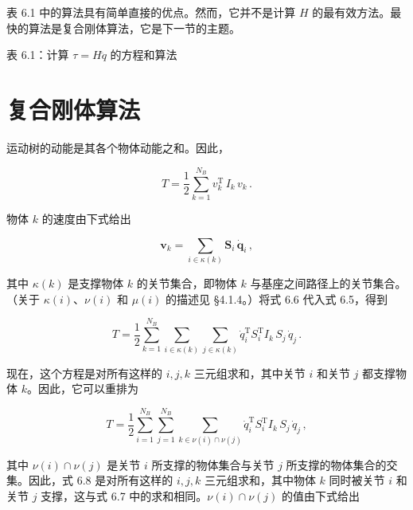 \documentclass[10pt,a4paper]{book}
\theoremstyle{thmstyle} %
\theoremstyle{defstyle} %
\theoremstyle{prostyle} %
\begin{document}
表 6.1 中的算法具有简单直接的优点。然而，它并不是计算 $H$ 的最有效方法。最快的算法是复合刚体算法，它是下一节的主题。



表 6.1：计算 $\tau = H\ddot{q}$ 的方程和算法





\section{复合刚体算法}





运动树的动能是其各个物体动能之和。因此，



$$
T = \frac { 1 } { 2 } \sum _ { k = 1 } ^{N _ { B} } v _ { k } ^{\mathrm { T} } \, I _ { k } \, v _ { k } \, .
$$



物体 $k$ 的速度由下式给出



$$
{ \boldsymbol { v } } _ { k } = \sum _ { i \in \kappa ( k ) } { \boldsymbol { S } } _ { i } \, { \dot { \boldsymbol { q } } } _ { i } \, ,
$$



其中 $\kappa(k)$ 是支撑物体 $k$ 的关节集合，即物体 $k$ 与基座之间路径上的关节集合。（关于 $\kappa(i)$、$\nu(i)$ 和 $\mu(i)$ 的描述见 §4.1.4。）将式 6.6 代入式 6.5，得到



$$
T = \frac { 1 } { 2 } \sum _ { k = 1 } ^{N _ { B} } \sum _ { i \in \kappa ( k ) } \sum _ { j \in \kappa ( k ) } \dot { q } _ { i } ^{\mathrm { T} } S _ { i } ^{\mathrm { T} } I _ { k } \, S _ { j } \, \dot { q } _ { j } \, .
$$



现在，这个方程是对所有这样的 $i,j,k$ 三元组求和，其中关节 $i$ 和关节 $j$ 都支撑物体 $k$。因此，它可以重排为



$$
T = \frac { 1 } { 2 } \sum _ { i = 1 } ^{N _ { B} } \sum _ { j = 1 } ^{N _ { B} } \sum _ { k \in \nu ( i ) \cap \nu ( j ) } \dot { q } _ { i } ^{\mathrm { T} } S _ { i } ^{\mathrm { T} } I _ { k } \, S _ { j } \, \dot { q } _ { j } \, ,
$$



其中 $\nu(i) \cap \nu(j)$ 是关节 $i$ 所支撑的物体集合与关节 $j$ 所支撑的物体集合的交集。因此，式 6.8 是对所有这样的 $i,j,k$ 三元组求和，其中物体 $k$ 同时被关节 $i$ 和关节 $j$ 支撑，这与式 6.7 中的求和相同。$\nu(i) \cap \nu(j)$ 的值由下式给出
\end{document}
